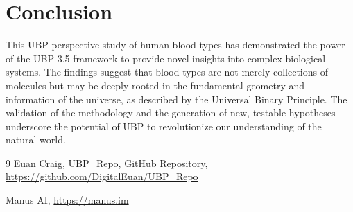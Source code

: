 \documentclass{article}
\begin{document}
\section{Conclusion}

This UBP perspective study of human blood types has demonstrated the power of the UBP 3.5 framework to provide novel insights into complex biological systems. The findings suggest that blood types are not merely collections of molecules but may be deeply rooted in the fundamental geometry and information of the universe, as described by the Universal Binary Principle. The validation of the methodology and the generation of new, testable hypotheses underscore the potential of UBP to revolutionize our understanding of the natural world.

\begin{thebibliography}{9}
Euan Craig, UBP_Repo, GitHub Repository, \url{https://github.com/DigitalEuan/UBP_Repo}

Manus AI, \url{https://manus.im}

\end{thebibliography}
\end{document}
